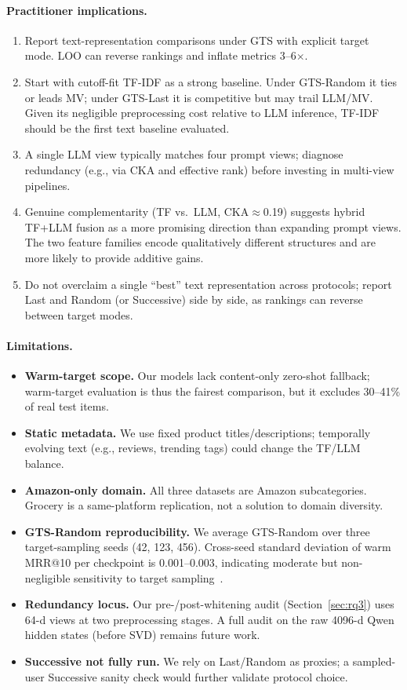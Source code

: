 \documentclass[sigconf,natbib=true,anonymous]{acmart}
\newcommand{\tfidf}{\textsc{TF-IDF}\xspace}
\newcommand{\llm}{\textsc{LLM}\xspace}
\begin{document}
\paragraph{Practitioner implications.}
\begin{enumerate}[leftmargin=*,itemsep=2pt]
\item Report text-representation comparisons under GTS with explicit target mode.  LOO can reverse rankings and inflate metrics 3--6$\times$.
\item Start with cutoff-fit \tfidf as a strong baseline.  Under GTS-Random it ties or leads MV; under GTS-Last it is competitive but may trail LLM/MV.  Given its negligible preprocessing cost relative to LLM inference, TF-IDF should be the first text baseline evaluated.
\item A single \llm view typically matches four prompt views; diagnose redundancy (e.g., via CKA and effective rank) before investing in multi-view pipelines.
\item Genuine complementarity (TF vs.\ LLM, CKA$\approx$0.19) suggests hybrid TF+LLM fusion as a more promising direction than expanding prompt views.  The two feature families encode qualitatively different structures and are more likely to provide additive gains.
\item Do not overclaim a single ``best'' text representation across protocols; report Last and Random (or Successive) side by side, as rankings can reverse between target modes.
\end{enumerate}

\paragraph{Limitations.}
\begin{itemize}[leftmargin=*,itemsep=1pt]
\item \textbf{Warm-target scope.}
Our models lack content-only zero-shot fallback; warm-target evaluation is thus the fairest comparison, but it excludes 30--41\% of real test items.
\item \textbf{Static metadata.}
We use fixed product titles/descriptions; temporally evolving text (e.g., reviews, trending tags) could change the TF/LLM balance.
\item \textbf{Amazon-only domain.}
All three datasets are Amazon subcategories.  Grocery is a same-platform replication, not a solution to domain diversity.
\item \textbf{GTS-Random reproducibility.}
We average GTS-Random over three target-sampling seeds (42, 123, 456).  Cross-seed standard deviation of warm MRR@10 per checkpoint is 0.001--0.003, indicating moderate but non-negligible sensitivity to target sampling~\cite{liang2024timetosplit}.
\item \textbf{Redundancy locus.}
Our pre-/post-whitening audit (Section~\ref{sec:rq3}) uses 64-d views at two preprocessing stages.  A full audit on the raw 4096-d Qwen hidden states (before SVD) remains future work.
\item \textbf{Successive not fully run.}
We rely on Last/Random as proxies; a sampled-user Successive sanity check would further validate protocol choice.
\end{itemize}
\end{document}
